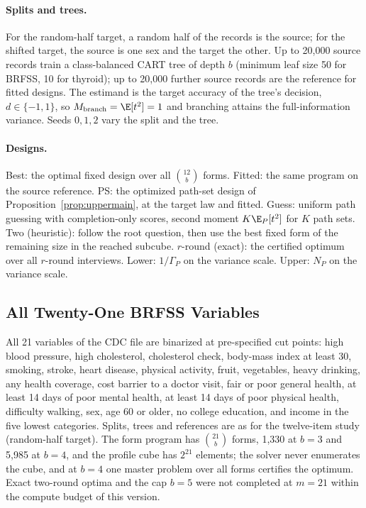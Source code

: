 \paragraph{Splits and trees.}
For the random-half target, a random half of the records is the source; for the shifted target, the source is one sex and the target the other. Up to 20,000 source records train a class-balanced CART tree of depth $b$ (minimum leaf size 50 for BRFSS, 10 for thyroid); up to 20,000 further source records are the reference for fitted designs. The estimand is the target accuracy of the tree's decision, $d\in\{-1,1\}$, so $M_{\rm branch}=\E[t^2]=1$ and branching attains the full-information variance. Seeds $0,1,2$ vary the split and the tree.

\paragraph{Designs.}
Best: the optimal fixed design over all $\binom{12}b$ forms. Fitted: the same program on the source reference. PS: the optimized path-set design of Proposition~\ref{prop:uppermain}, at the target law and fitted. Guess: uniform path guessing with completion-only scores, second moment $K\E_P[t^2]$ for $K$ path sets. Two (heuristic): follow the root question, then use the best fixed form of the remaining size in the reached subcube. $r$-round (exact): the certified optimum over all $r$-round interviews. Lower: $1/\Gamma_P$ on the variance scale. Upper: $N_P$ on the variance scale.


\subsection{All Twenty-One BRFSS Variables}\label{app:scale}
All 21 variables of the CDC file are binarized at pre-specified cut points: high blood pressure, high cholesterol, cholesterol check, body-mass index at least 30, smoking, stroke, heart disease, physical activity, fruit, vegetables, heavy drinking, any health coverage, cost barrier to a doctor visit, fair or poor general health, at least 14 days of poor mental health, at least 14 days of poor physical health, difficulty walking, sex, age 60 or older, no college education, and income in the five lowest categories. Splits, trees and references are as for the twelve-item study (random-half target). The form program has $\binom{21}b$ forms, 1,330 at $b=3$ and 5,985 at $b=4$, and the profile cube has $2^{21}$ elements; the solver never enumerates the cube, and at $b=4$ one master problem over all forms certifies the optimum. Exact two-round optima and the cap $b=5$ were not completed at $m=21$ within the compute budget of this version.


